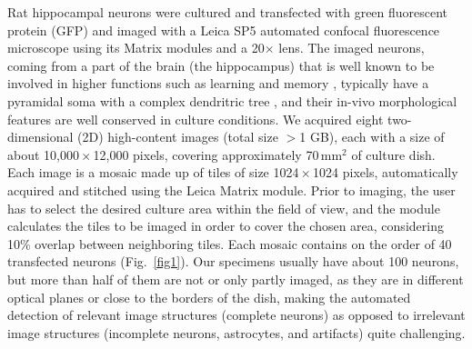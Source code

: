 Rat hippocampal neurons were cultured and transfected with green fluorescent protein (GFP) and imaged with a Leica SP5 automated confocal fluorescence microscope using its Matrix modules and a 20$\times$ lens. The imaged neurons, coming from a part of the brain (the hippocampus) that is well known to be involved in higher functions such as learning and memory \cite{squire1992memory}, typically have a pyramidal soma with a complex dendritric tree \cite{goslin1998rat}, and their in-vivo morphological features are well conserved in culture conditions. We acquired eight two-dimensional (2D) high-content images (total size $>$1 GB), each with a size of about 10,000\,$\times$\,12,000 pixels, covering approximately 70\,mm${}^2$ of culture dish. Each image is a mosaic made up of tiles of size 1024\,$\times$\,1024 pixels, automatically acquired and stitched using the Leica Matrix module. Prior to imaging, the user has to select the desired culture area within the field of view, and the module calculates the tiles to be imaged in order to cover the chosen area, considering 10\% overlap between neighboring tiles. Each mosaic contains on the order of 40 transfected neurons (Fig.\ \ref{fig1}). Our specimens usually have about 100 neurons, but more than half of them are not or only partly imaged, as they are in different optical planes or close to the borders of the dish, making the automated detection of relevant image structures (complete neurons) as opposed to irrelevant image structures (incomplete neurons, astrocytes, and artifacts) quite challenging.

